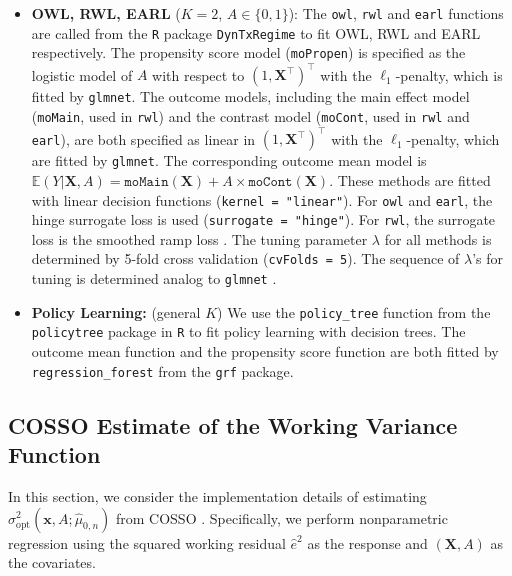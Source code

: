\documentclass[11pt]{article}
\numberwithin{equation}{section}
\theoremstyle{definition}
\theoremstyle{remark}
\newcommand{\bx}{\bm{x}}
\newcommand{\bX}{\bm{X}}
\newcommand{\bbE}{\mathbb{E}}
\newcommand{\opt}{\mathrm{opt}}
\begin{document}
\begin{itemize}[leftmargin=*]
	\item \textbf{OWL, RWL, EARL} ($ K = 2 $, $ A \in \{0,1\} $): The \texttt{owl}, \texttt{rwl} and \texttt{earl} functions are called from the \texttt{R} package \texttt{DynTxRegime} to fit OWL, RWL and EARL respectively. The propensity score model (\texttt{moPropen}) is specified as the logistic model of $ A $ with respect to $ (1,\bX^{\intercal})^{\intercal} $ with the $ \ell_{1} $-penalty, which is fitted by \texttt{glmnet}. The outcome models, including the main effect model (\texttt{moMain}, used in \texttt{rwl}) and the contrast model (\texttt{moCont}, used in \texttt{rwl} and \texttt{earl}), are both specified as linear in $ (1,\bX^{\intercal})^{\intercal} $ with the $ \ell_{1} $-penalty, which are fitted by \texttt{glmnet}. The corresponding outcome mean model is $ \bbE(Y|\bX, A) = \texttt{moMain}(\bX) + A \times  \texttt{moCont}(\bX) $. These methods are fitted with linear decision functions (\texttt{kernel = "linear"}). For \texttt{owl} and \texttt{earl}, the hinge surrogate loss is used (\texttt{surrogate = "hinge"}). For \texttt{rwl}, the surrogate loss is the smoothed ramp loss \citep{zhou2017residual}. The tuning parameter $ \lambda $ for all methods is determined by 5-fold cross validation (\texttt{cvFolds = 5}). The sequence of $ \lambda $'s for tuning is determined analog to \texttt{glmnet} \citep{friedman2010regularization}.
	
	\item \textbf{Policy Learning:} (general $ K $) We use the \texttt{policy\_tree} function from the \texttt{policytree} package \citep{sverdrup2020policytree} in \texttt{R} to fit policy learning with decision trees. The outcome mean function and the propensity score function are both fitted by \texttt{regression\_forest} from the \texttt{grf} package.
\end{itemize}

\newpage

\subsection{COSSO Estimate of the Working Variance Function}\label{sec:var_cosso}

In this section, we consider the implementation details of estimating $ \sigma_{\opt}^{2}(\bx,A;\widehat{\mu}_{0,n}) $ from COSSO \citep{lin2006component}. Specifically, we perform nonparametric regression using the squared working residual $ \widehat{e}^{2} $ as the response and $ (\bX,A) $ as the covariates. 
\end{document}
